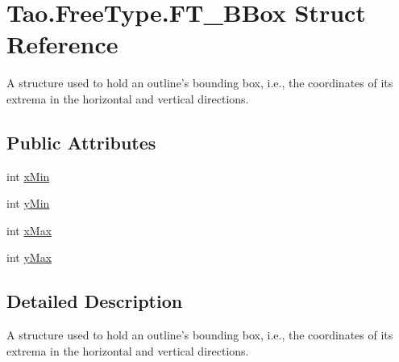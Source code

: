 \hypertarget{struct_tao_1_1_free_type_1_1_f_t___b_box}{
\section{Tao.FreeType.FT\_\-BBox Struct Reference}
\label{struct_tao_1_1_free_type_1_1_f_t___b_box}
}


A structure used to hold an outline's bounding box, i.e., the coordinates of its extrema in the horizontal and vertical directions.  


\subsection*{Public Attributes}
\begin{DoxyCompactItemize}
\item 
int \hyperlink{struct_tao_1_1_free_type_1_1_f_t___b_box_aa7c354ea7771f78c65baa946dc5c044f}{xMin}
\item 
int \hyperlink{struct_tao_1_1_free_type_1_1_f_t___b_box_a4a3cbcef286ee2d42a028df6dc6b33cb}{yMin}
\item 
int \hyperlink{struct_tao_1_1_free_type_1_1_f_t___b_box_a953f001ff627dc2e983b0b809b57629d}{xMax}
\item 
int \hyperlink{struct_tao_1_1_free_type_1_1_f_t___b_box_a04079183dbbfe8ba0be69f16e0fa05d8}{yMax}
\end{DoxyCompactItemize}


\subsection{Detailed Description}
A structure used to hold an outline's bounding box, i.e., the coordinates of its extrema in the horizontal and vertical directions. 

